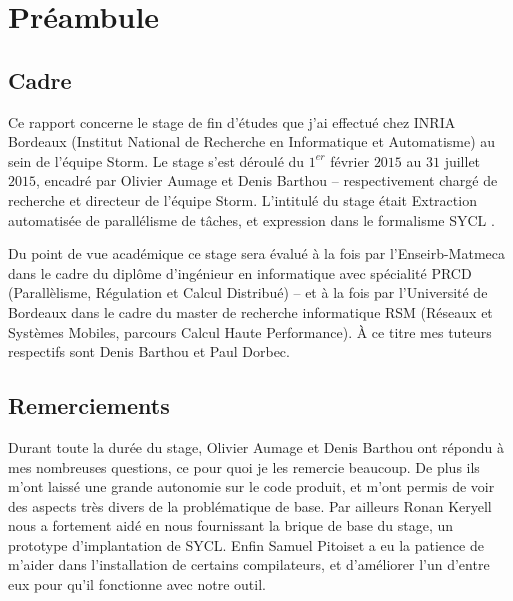 \documentclass[11pt,onecolumn]{report}
\begin{document}


\tableofcontents

\chapter*{Préambule}

\section*{Cadre}

Ce rapport concerne le stage de fin d'études que j'ai effectué chez INRIA Bordeaux (Institut National de Recherche en Informatique et Automatisme) au sein de l'équipe Storm. Le stage s'est déroulé du $1^{er}$ février $2015$ au $31$ juillet $2015$, encadré par Olivier Aumage et Denis Barthou -- respectivement chargé de recherche et directeur de l'équipe Storm. L'intitulé du stage était \og Extraction automatisée de parallélisme de tâches, et expression dans le formalisme SYCL \fg.

Du point de vue académique ce stage sera évalué à la fois par l'Enseirb-Matmeca dans le cadre du diplôme d'ingénieur en informatique avec spécialité PRCD (Parallèlisme, Régulation et Calcul Distribué) -- et à la fois par l'Université de Bordeaux dans le cadre du master de recherche informatique RSM (Réseaux et Systèmes Mobiles, parcours Calcul Haute Performance). À ce titre mes tuteurs respectifs sont Denis Barthou et Paul Dorbec.

\section*{Remerciements}

Durant toute la durée du stage, Olivier Aumage et Denis Barthou ont répondu à mes nombreuses questions, ce pour quoi je les remercie beaucoup. De plus ils m'ont laissé une grande autonomie sur le code produit, et m'ont permis de voir des aspects très divers de la problématique de base. Par ailleurs Ronan Keryell nous a fortement aidé en nous fournissant la brique de base du stage, un prototype d'implantation de SYCL. Enfin Samuel Pitoiset a eu la patience de m'aider dans l'installation de certains compilateurs, et d'améliorer l'un d'entre eux pour qu'il fonctionne avec notre outil.



\end{document}
